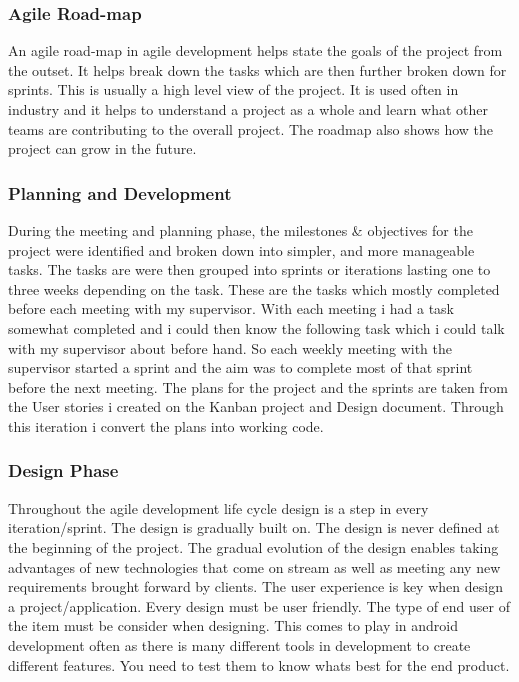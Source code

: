 \subsubsection{Agile Road-map}
An agile road-map in agile development helps state the goals of the project from the outset. It helps break down the tasks which are then further broken down for sprints. This is usually a high level view of the project. It is used often in industry and it helps to understand a project as a whole and learn what other teams are contributing to the overall project. The roadmap also shows how the project can grow in the future.

\subsubsection{Planning and Development}
During the meeting and planning phase, the milestones \& objectives for the project were identified and broken down into simpler, and more manageable tasks. The tasks are were then grouped into sprints or iterations lasting one to three weeks depending on the task. These are the tasks which mostly completed before each meeting with my supervisor. With each meeting i had a task somewhat completed and i could then know the following task which i could talk with my supervisor about before hand. So each weekly meeting with the supervisor started a sprint and the aim was to complete most of that sprint before the next meeting. The plans for the project and the sprints are taken from the User stories i created on the Kanban project and Design document. Through this iteration i convert the plans into working code.

\subsubsection{Design Phase}
Throughout the agile development life cycle design is a step in every iteration/sprint. The design is gradually built on. The design is never defined at the beginning of the project. The gradual evolution of the design enables taking advantages of new technologies that come on stream as well as meeting any new requirements brought forward by clients. The user experience is key when design a project/application. Every design must be user friendly. The type of end user of the item must be consider when designing. This comes to play in android development often as there is many different tools in development to create different features. You need to test them to know whats best for the end product.

